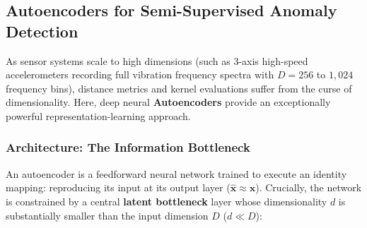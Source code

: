\subsection{Autoencoders for Semi-Supervised Anomaly Detection}\label{subsec:autoencoders}

As sensor systems scale to high dimensions (such as 3-axis high-speed accelerometers recording full vibration frequency spectra with $D = 256$ to $1{,}024$ frequency bins), distance metrics and kernel evaluations suffer from the curse of dimensionality. Here, deep neural \textbf{Autoencoders} provide an exceptionally powerful representation-learning approach.

\subsubsection{Architecture: The Information Bottleneck}

An autoencoder is a feedforward neural network trained to execute an identity mapping: reproducing its input at its output layer ($\hat{\mathbf{x}} \approx \mathbf{x}$). Crucially, the network is constrained by a central \textbf{latent bottleneck} layer whose dimensionality $d$ is substantially smaller than the input dimension $D$ ($d \ll D$):

